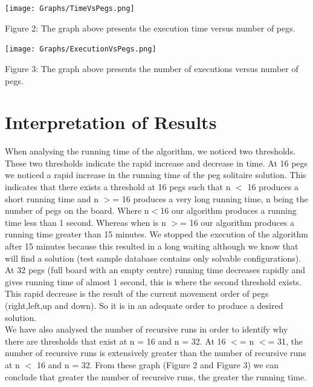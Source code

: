 \documentclass{article}
\begin{document}
\begin{center}
\texttt{[image: Graphs/TimeVsPegs.png]}\\
\end{center}
Figure 2: The graph above presents the execution time versus number of pegs.\\

\begin{center}
\texttt{[image: Graphs/ExecutionVsPegs.png]}
\end{center}
Figure 3: The graph above presents the number of executions versus number of pegs.\\

\section{Interpretation of Results}
When analysing the running time of the algorithm, we noticed two thresholds. These two thresholds indicate the rapid increase and decrease in time.
At 16 pegs we noticed a rapid increase in the running time of the peg solitaire solution. This indicates that there exists a threshold at 16 pegs such that n $<$ 16 produces a short running time and n $>$= 16 produces a very long running time, n being the number of pegs on the board. Where n$<$16 our algorithm produces a running time less than 1 second. Whereas when is n $>$= 16 our algorithm produces a running time greater than 15 minutes. We stopped the execution of the  algorithm after 15 minutes because this resulted in a long waiting although we know that will find a solution (test sample database contains only solvable configurations). At 32 pegs (full board with an empty centre) running time decreases rapidly and gives running time of almost 1 second, this is where the second threshold exists. This rapid decrease is  the result of the current movement order of pegs (right,left,up and down). So it is in an adequate order to produce a desired solution.
\\We have also analysed the number of recursive runs in order to identify why there are thresholds that exist at n = 16 and n = 32. At 16 $<$= n $<$= 31, the number of recursive runs is extensively greater than the number of recursive runs at n $<$ 16 and n = 32. From these graph (Figure 2 and Figure 3) we can conclude that greater the number of recursive runs, the greater the running time.
\end{document}
